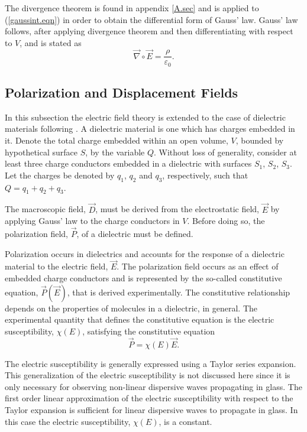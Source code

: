 \documentclass[12pt]{article}
\theoremstyle{definition}
\numberwithin{equation}{section}
\begin{document}
The divergence theorem is found in appendix \ref{A.sec} and is applied to (\ref{gaussint.eqn}) in order to obtain the differential form of Gauss' law. Gauss' law follows, after applying divergence theorem and then differentiating with respect to $V$, and is stated as
\begin{equation}
\vec{\nabla}\circ\vec{E}=\frac{\rho}{\varepsilon_0}.
\label{e_gauss_diff.eqn}
\end{equation}
\subsection{Polarization and Displacement Fields}\label{displacement.sec}
In this subsection the electric field theory is extended to the case of dielectric materials following \cite{Reitz}. A dielectric material is one which has charges embedded in it. Denote the total charge embedded within an open volume, $V$, bounded by hypothetical surface $S$, by the variable $Q$. Without loss of generality, consider at least three charge conductors embedded in a dielectric with surfaces $S_1$, $S_2$, $S_3$. Let the charges be denoted by $q_1$, $q_2$ and $q_3$, respectively, such that $Q=q_1+q_2+q_3$.

The macroscopic field, $\vec{D}$, must be derived from the electrostatic field, $\vec{E}$ by applying Gauss' law to the charge conductors in $V$. Before doing so, the polarization field, $\vec{P}$, of a dielectric must be defined. 

Polarization occurs in dielectrics and accounts for the response of a dielectric material to the electric field, $\vec{E}$. The polarization field occurs as an effect of embedded charge conductors and is represented by the so-called constitutive equation, $\vec{P}(\vec{E})$, that is derived experimentally. The constitutive relationship depends on the properties of molecules in a dielectric, in general. The experimental quantity that defines the constitutive equation is the electric susceptibility, $\chi(E)$, satisfying the constitutive equation
\begin{equation}
\vec{P}=\chi(E)\vec{E}.
\label{constitutive.eqn}
\end{equation}

The electric susceptibility is generally expressed using a Taylor series expansion. This generalization of the electric susceptibility is not discussed here since it is only necessary for observing non-linear dispersive waves propagating in glass. The first order linear approximation of the electric susceptibility with respect to the Taylor expansion is sufficient for linear dispersive waves to propagate in glass. In this case the electric susceptibility, $\chi(E)$, is a constant.
\end{document}
